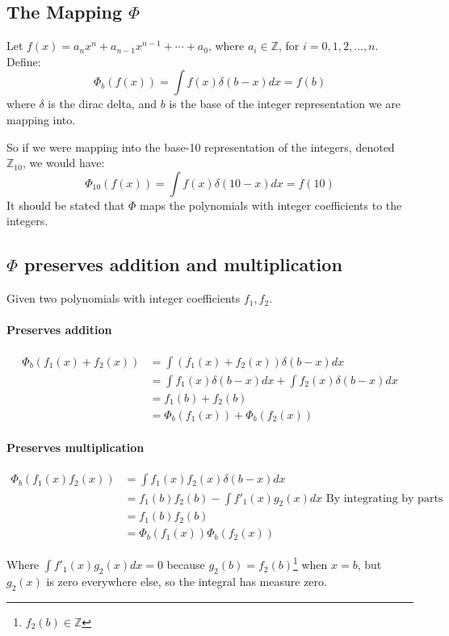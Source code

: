 \documentclass[12pt]{article}
\begin{document}
\begin{appendices}
\section*{The Mapping $\Phi$}

Let $f(x) = a_n x^n +a_{n-1} x^{n-1} + \cdots + a_0$, where $a_i \in \mathbb{Z}$, for $i=0, 1, 2, \ldots, n$.\\

Define:
$$
\Phi_b(f(x)) = \int f(x) \delta(b-x)dx = f(b)
$$
where $\delta$ is the dirac delta, and $b$ is the base of the integer representation we are mapping into.

So if we were mapping into the base-10 representation of the integers, denoted $\mathbb{Z}_{10}$, we would have:
$$
\Phi_{10}(f(x))  = \int f(x) \delta(10-x) dx = f(10)
$$
It should be stated that $\Phi$ maps the polynomials with integer coefficients to the integers.

\subsection*{$\Phi$ preserves addition and multiplication}

Given two polynomials with integer coefficients $f_1, f_2$.
\paragraph*{Preserves addition}
\begin{align*}
\Phi_b(f_1(x)+f_2(x)) &= \int (f_1(x) + f_2(x)) \delta(b-x) dx \\
&= \int f_1(x) \delta(b-x) dx + \int f_2(x) \delta(b-x) dx \\
&= f_1(b) + f_2(b)\\
&= \Phi_b(f_1(x)) + \Phi_b(f_2(x))
\end{align*}

\paragraph{Preserves multiplication}
\begin{align*}
\Phi_b(f_1(x) f_2(x)) &= \int f_1(x) f_2(x) \delta(b-x) dx \\
&= f_1(b) f_2(b) - \int f'_1(x) g_2(x)dx \text{ By integrating by parts }\\
&= f_1(b) f_2(b)\\
&= \Phi_b(f_1(x)) \Phi_b(f_2(x))
\end{align*}

Where $\int f'_1(x) g_2(x) dx = 0$ because $g_2(b) = f_2(b)$\footnote{$f_2(b) \in \mathbb{Z}$} when $x=b$, but $g_2(x)$ is zero everywhere else, so the integral has measure zero.


\end{appendices}
\end{document}
